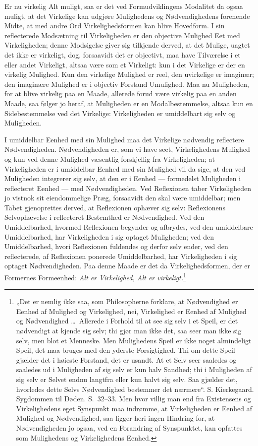 \documentclass[12pt]{book}
\newcommand{\opage}[1]{\marginnote{\footnotesize\textit{[#1]}}}
\begin{document}
\opage{250}Er nu virkelig Alt muligt, saa er det ved Formudviklingens
Modalitet da ogsaa muligt, at det Virkelige kan udgjøre
Mulighedens og Nødvendighedens forenende Midte, at
med andre Ord Virkelighedsformen kan blive Hovedform. I
sin reflecterede Modsætning til Virkeligheden er den objective
Mulighed Eet med Virkeligheden; denne Modsigelse giver sig
tilkjende derved, at det Mulige, uagtet det ikke er virkeligt,
dog, forsaavidt det er objectivt, maa have Tilværelse i et eller
andet Virkeligt, altsaa være som et Virkeligt: kun i det Virkelige
er der en virkelig Mulighed. Kun den virkelige Mulighed
er reel, den uvirkelige er imaginær; den imaginære
Mulighed er i objectiv Forstand Umulighed. Maa nu Muligheden,
for at blive virkelig paa en Maade, allerede forud
være virkelig paa en anden Maade, saa følger jo heraf, at
Muligheden er en Modalbestemmelse, altsaa kun en Sidebestemmelse
ved det Virkelige: Virkeligheden er umiddelbart sig
selv og Muligheden.

I umiddelbar Eenhed med sin Mulighed maa det Virkelige
nødvendig reflectere Nødvendigheden. Nødvendigheden
er, som vi have seet, Virkelighedens Mulighed og kun ved
denne Mulighed væsentlig forskjellig fra Virkeligheden; at
Virkeligheden er i umiddelbar Eenhed med sin Mulighed vil
da sige, at den ved Muligheden integrerer sig selv, at den er
i Eenhed --- formedelst Muligheden i reflecteret Eenhed --- med
Nødvendigheden. Ved Reflexionen taber Virkeligheden jo vistnok
sit eiendommelige Præg, forsaavidt den skal være umiddelbar;
men Tabet gjenoprettes derved, at Reflexionen ophæver sig
selv: Reflexionens Selvophævelse i reflecteret Bestemthed er
Nødvendighed. Ved den Umiddelbarhed, hvormed Reflexionen
begynder og afbrydes, ved den umiddelbare Umiddelbarhed,
\opage{251}har Virkeligheden i sig optaget Muligheden; ved den Umiddelbarhed,
hvori Reflexionen fuldendes og derfor selv ender,
ved den reflecterede, af Reflexionen ponerede Umiddelbarhed,
har Virkeligheden i sig optaget Nødvendigheden. Paa denne
Maade er det da Virkelighedsformen, der er Formernes Formeenhed:
\emph{Alt er Virkelighed, Alt er virkeligt.}\footnote{„Det er nemlig ikke saa, som Philosopherne forklare, at Nødvendighed
er Eenhed af Mulighed og Virkelighed, nei, Virkelighed er
Eenhed af Mulighed og Nødvendighed \dots\ Allerede i Forhold til
at see sig selv i et Speil, er det nødvendigt at kjende sig selv; thi
gjør man ikke det, saa seer man ikke sig selv, men blot et Menneske.
Men Mulighedens Speil er ikke noget almindeligt Speil,
det maa bruges med den yderste Forsigtighed. Thi om dette Speil
gjælder det i høieste Forstand, det er usandt. At et Selv seer
saaledes og saaledes ud i Muligheden af sig selv er kun halv
Sandhed; thi i Muligheden af sig selv er Selvet endnu langtfra
eller kun halvt sig selv. Saa gjælder det, hvorledes dette Selvs
Nødvendighed bestemmer det nærmere“. S. Kierkegaard. Sygdommen
til Døden. S.~32--33. Men hvor villig man end fra Existensens
og Virkelighedens eget Synspunkt maa indrømme, at Virkeligheden
er Eenhed af Mulighed og Nødvendighed, saa ligger heri ingen
Hindring for, at Nødvendigheden jo ogsaa, ved en Forandring af
Synspunktet, kan opfattes som Mulighedens og Virkelighedens
Eenhed.}%
\end{document}
